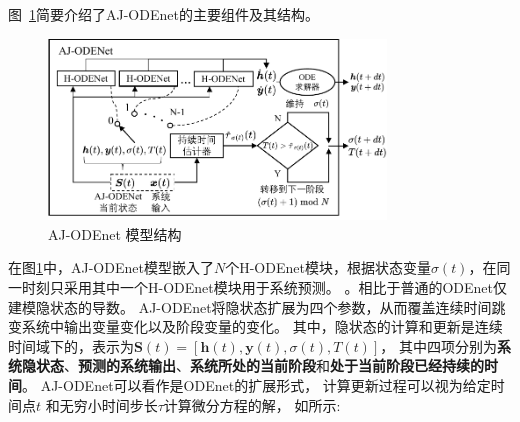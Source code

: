 图~\ref{fig:AJ_ODEs}简要介绍了AJ-ODEnet的主要组件及其结构。
\begin{figure}
    \centering
    \includegraphics[width=0.8\textwidth]{figures/chapter4/Jump-ODEnet.pdf}
    \caption{AJ-ODEnet 模型结构}
    \label{fig:AJ_ODEs}
\end{figure}
在图\ref{fig:AJ_ODEs}中，AJ-ODEnet模型嵌入了$N$个H-ODEnet模块，根据状态变量$\sigma(t)$，在同一时刻只采用其中一个H-ODEnet模块用于系统预测。
。相比于普通的ODEnet仅建模隐状态的导数。
AJ-ODEnet将隐状态扩展为四个参数，从而覆盖连续时间跳变系统中输出变量变化以及阶段变量的变化。
其中，隐状态的计算和更新是连续时间域下的，表示为$\boldsymbol{S}(t) = [\boldsymbol h(t), \boldsymbol y(t), \sigma(t), T(t)]$，
其中四项分别为\textbf{系统隐状态}、\textbf{预测的系统输出}、\textbf{系统所处的当前阶段}和\textbf{处于当前阶段已经持续的时间}。
AJ-ODEnet可以看作是ODEnet的扩展形式，
计算更新过程可以视为给定时间点$t$ 和无穷小时间步长$\tau$计算微分方程的解，
如所示:



